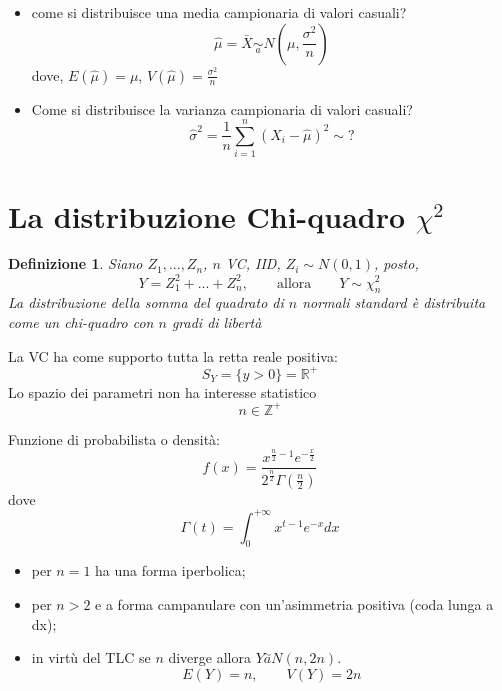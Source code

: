 \documentclass[
  11pt,
]{book}
\providecommand{\tightlist}{%
  \setlength{\itemsep}{0pt}\setlength{\parskip}{0pt}}
\theoremstyle{mytheoremstyle}
\theoremstyle{mydefstyle}
\newtheorem{definition}{Definizione}[section]
\begin{document}
\begin{itemize}
\tightlist
\item
  come si distribuisce una media campionaria di valori casuali?
  \[\hat \mu=\bar X \operatorname*{\sim}_a N\left(\mu,\frac{\sigma^2}n\right)\]
  dove, \(E(\hat\mu)=\mu\), \(V(\hat\mu)=\frac{\sigma^2}n\)
\item
  Come si distribuisce la varianza campionaria di valori casuali?
  \[\hat\sigma^2=\frac 1 n \sum_{i=1}^n (X_i-\hat \mu)^2 \sim ?\]
\end{itemize}

\section{\texorpdfstring{La distribuzione Chi-quadro \(\chi^2\)}{La distribuzione Chi-quadro \textbackslash chi\^{}2}}\label{la-distribuzione-chi-quadro-chi2}

\begin{info}

\begin{definition}
Siano \(Z_1,...,Z_n\), \(n\) VC, IID, \(Z_i\sim N(0,1)\), posto,
\[Y=Z_1^2+...+Z_n^2, \qquad \text{allora} \qquad Y\sim \chi^2_n\]
La distribuzione della somma del quadrato di \(n\) normali standard è distribuita come un chi-quadro con \(n\) \emph{gradi di libertà}
\end{definition}

\end{info}

\begin{info}
La VC ha come supporto tutta la retta reale positiva:
\[S_Y=\{y>0\}=\mathbb{R}^+\]
Lo spazio dei parametri non ha interesse statistico
\[n\in\mathbb{Z}^+\]

\end{info}

Funzione di probabilista o densità:
\[
f(x)=\dfrac {x^{{\frac {n}{2}}-1}e^{-{\frac {x}{2}}}}{2^{\frac {n}{2}}\Gamma \left({\frac {n}{2}}\right)}
\]
dove
\[
\Gamma(t)=\int_0^{+\infty}x^{t-1}e^{-x}dx
\]

\begin{info}

\begin{itemize}
\tightlist
\item
  per \(n = 1\) ha una forma iperbolica;
\item
  per \(n>2\) e a forma campanulare con un'asimmetria positiva (coda lunga a dx);
\item
  in virtù del TLC se \(n\) diverge allora \(Y\stackrel{\sim}{a}N(n,2n)\).
  \[E(Y)=n,\qquad V(Y)=2n\]
\end{itemize}

\end{info}
\end{document}
